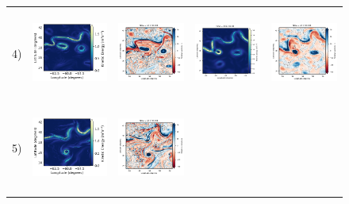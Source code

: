 \begin{bibunit}
\begin{figure}[H]
\begin{center}
\begin{tabular}{ccccc}
\hspace{-10mm} 4) &
 \includegraphics[trim={0 16mm 26mm 5mm},clip, width=3.3cm,height=2.9cm]{00_Simulearning/figures/plots2/natl60_train_ke.png} &
 \includegraphics[trim={13mm 13mm 22mm 6mm},clip, width=2.9cm,height=2.9cm]{00_Simulearning/figures/plots/natl60_train_vort_r.png} &
 \includegraphics[trim={13mm 13mm 22mm 6mm},clip, width=2.9cm,height=2.9cm]{00_Simulearning/figures/plots/natl60_rec_ke.png} &
 \includegraphics[trim={13mm 13mm 22mm 6mm},clip,width=2.9cm,height=2.9cm]{00_Simulearning/figures/plots/natl60_rec_vort_r.png} \\
\hspace{-10mm} 5) &
\includegraphics[trim={0 16mm 26mm 5mm},clip, width=3.3cm,height=2.9cm]{00_Simulearning/figures/plots2/enatl60-t_train_ke.png} &
\includegraphics[trim={13mm 13mm 22mm 6mm},clip, width=2.9cm,height=2.9cm]{00_Simulearning/figures/plots/enatl60-t_train_vort_r.png} &

\end{tabular}
\end{center}
\end{figure}
\end{bibunit}
